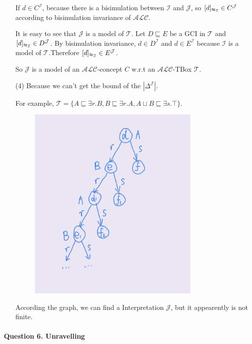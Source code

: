 \documentclass[12pt]{article}
\begin{document}
\begin{enumerate}
If $d \in C^{\mathcal{I}}$, because there is a bisimulation between $\mathcal{I}$ and $\mathcal{J}$, so $[d]_{\thickapprox_{\mathcal{I}}} \in C^{\mathcal{J}}$ according to  bisimulation invariance of $\mathcal{ALC}$.

It is easy to see that $\mathcal{J}$ is a model of $\mathcal{T}$. Let $D \sqsubseteq E$ be a GCI in $\mathcal{T}$ and $[d]_{\thickapprox_{\mathcal{I}}} \in D^{\mathcal{J}}$. By bisimulation invariance, $d \in D^{\mathcal{I}}$ and  $d \in E^{\mathcal{I}}$ because $\mathcal{I}$ is a model of $\mathcal{T}$.Therefore $[d]_{\thickapprox_{\mathcal{I}}} \in E^{\mathcal{J}}$.

So $\mathcal{J}$ is a model of an $\mathcal{ALC}$-concept $C$ w.r.t an $\mathcal{ALC}$-TBox $\mathcal{T}$.
        \item [(4)]
        Because we can't  get the bound of the $|\Delta^{\mathcal{J}}|$.\par
        For example,  $\mathcal{T} = \{A\sqsubseteq \exists r.B, B \sqsubseteq \exists r.A, A\sqcup B\sqsubseteq \exists s.\top \}$. \par
\begin{figure}[htbp]
    \centering
    \includegraphics[width=0.8\textwidth,height=0.5\textwidth]{4.jpg}
\end{figure}
According the graph, we can find a Interpretation $\mathcal{J}$, but it appearently is not finite.\par
    \end{enumerate}

    \paragraph{Question 6. Unravelling}~{}
    \\
\end{document}

